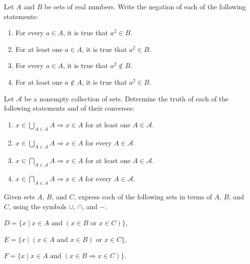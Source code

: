  \begin{exercise}[Munkres 1.4]
    Let $A$ and $B$ be sets of real numbers. Write the negation of each of the following statements:
    \begin{enumerate}
      \item For every $a \in A$, it is true that $a^2 \in B$.
      \item For at least one $a \in A$, it is true that $a^2 \in B$.
      \item For every $a \in A$, it is true that $a^2 \notin B$.
      \item For at least one $a \notin A$, it is true that $a^2 \in B$.
    \end{enumerate}
  \end{exercise}
  \begin{solution}
    
  \end{solution}

  \begin{exercise}[Munkres 1.5]
    Let $\mathcal{A}$ be a nonempty collection of sets. Determine the truth of each of the following statements and of their converses:
    \begin{enumerate}
      \item $x \in \bigcup_{A \in \mathcal{A}} A \Rightarrow x \in A$ for at least one $A \in \mathcal{A}$.
      \item $x \in \bigcup_{A \in \mathcal{A}} A \Rightarrow x \in A$ for every $A \in \mathcal{A}$.
      \item $x \in \bigcap_{A \in \mathcal{A}} A \Rightarrow x \in A$ for at least one $A \in \mathcal{A}$.
      \item $x \in \bigcap_{A \in \mathcal{A}} A \Rightarrow x \in A$ for every $A \in \mathcal{A}$.
    \end{enumerate}
  \end{exercise}
  \begin{solution}
    
  \end{solution}

  \begin{exercise}[Munkres 1.7]
    Given sets $A$, $B$, and $C$, express each of the following sets in terms of $A$, $B$, and $C$, using the symbols $\cup$, $\cap$, and $-$.

    $D = \{x \mid x \in A \text{ and } (x \in B \text{ or } x \in C)\}$,

    $E = \{x \mid (x \in A \text{ and } x \in B) \text{ or } x \in C\}$,

    $F = \{x \mid x \in A \text{ and } (x \in B \Rightarrow x \in C)\}$.
  \end{exercise}
  \begin{solution}
    
  \end{solution}

